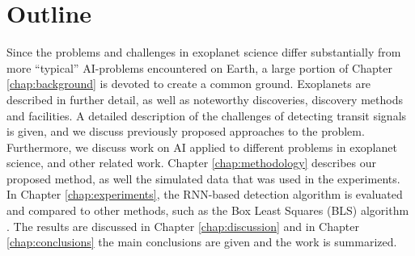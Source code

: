 
\section{Outline}

Since the problems and challenges in exoplanet science differ substantially from more ``typical'' AI-problems encountered on Earth, a large portion of Chapter \ref{chap:background} is devoted to create a common ground. Exoplanets are described in further detail, as well as noteworthy discoveries, discovery methods and facilities. A detailed description of the challenges of detecting transit signals is given, and we discuss previously proposed approaches to the problem. Furthermore, we discuss work on AI applied to different problems in exoplanet science, and other related work. Chapter \ref{chap:methodology} describes our proposed method, as well the simulated data that was used in the experiments. In Chapter \ref{chap:experiments}, the RNN-based detection algorithm is evaluated and compared to other methods, such as the Box Least Squares (BLS) algorithm \cite{kovacs2002box}. The results are discussed in Chapter \ref{chap:discussion} and in Chapter \ref{chap:conclusions} the main conclusions are given and the work is summarized.
